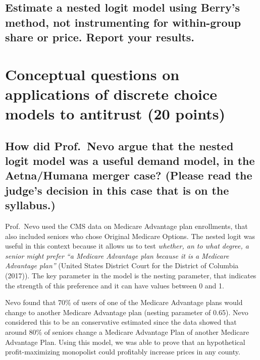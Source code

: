\documentclass[]{article}
\begin{document}
\hypertarget{estimate-a-nested-logit-model-using-berrys-method-not-instrumenting-for-within-group-share-or-price.-report-your-results.}{%
\subsection{Estimate a nested logit model using Berry's method, not
instrumenting for within-group share or price. Report your
results.}\label{estimate-a-nested-logit-model-using-berrys-method-not-instrumenting-for-within-group-share-or-price.-report-your-results.}}

\hypertarget{conceptual-questions-on-applications-of-discrete-choice-models-to-antitrust-20-points}{%
\section{Conceptual questions on applications of discrete choice models
to antitrust (20
points)}\label{conceptual-questions-on-applications-of-discrete-choice-models-to-antitrust-20-points}}

\hypertarget{how-did-prof.nevo-argue-that-the-nested-logit-model-was-a-useful-demand-model-in-the-aetnahumana-merger-case-please-read-the-judges-decision-in-this-case-that-is-on-the-syllabus.}{%
\subsection{How did Prof.~Nevo argue that the nested logit model was a
useful demand model, in the Aetna/Humana merger case? (Please read the
judge's decision in this case that is on the
syllabus.)}\label{how-did-prof.nevo-argue-that-the-nested-logit-model-was-a-useful-demand-model-in-the-aetnahumana-merger-case-please-read-the-judges-decision-in-this-case-that-is-on-the-syllabus.}}

Prof.~Nevo used the CMS data on Medicare Advantage plan enrollments,
that also included seniors who chose Original Medicare Options. The
nested logit was useful in this context because it allows us to test
\emph{whether, an to what degree, a senior might prefer ``a Medicare
Advantage plan because it is a Medicare Advantage plan''} (United States
District Court for the District of Columbia (2017)). The key parameter
in the model is the nesting parameter, that indicates the strength of
this preference and it can have values between 0 and 1.

Nevo found that 70\% of users of one of the Medicare Advantage plans
would change to another Medicare Advantage plan (nesting parameter of
0.65). Nevo considered this to be an conservative estimated since the
data showed that around 80\% of seniors change a Medicare Advantage Plan
of another Medicare Advantage Plan. Using this model, we was able to
prove that an hypothetical profit-maximizing monopolist could profitably
increase prices in any county.
\end{document}
